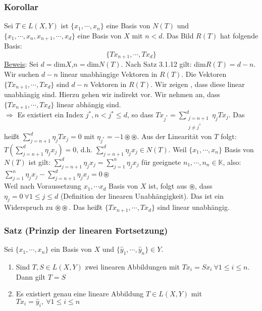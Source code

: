 \subsubsection{Korollar}
Sei $T\in L(X,Y)$ ist $\{x_1,\cdots ,x_n\}$ eine Basis von $N(T)$ und $\{x_1,\cdots ,x_n,x_{n+1},\cdots ,x_d\}$ eine Basis von $X$ mit $n<d$.  Das Bild $R(T)$ hat folgende Basis:
\[\{Tx_{n+1},\cdots ,Tx_d\}\]
\underline{Beweis}:  Sei $d=$dim$X$,$n=$dim$N(T)$.  Nach Satz 3.1.12 gilt:
dim$R(T)=d-n$.  Wir suchen $d-n$ linear unabhängige Vektoren in $R(T)$.  Die Vektoren $\{Tx_{n+1},\cdots ,Tx_d\}$ sind $d-n$ Vektoren in $R(T)$.  Wir zeigen , dass diese linear unabhängig sind. Hierzu gehen wir indirekt vor.  Wir nehmen an, dass $\{Tx_{n+1},\cdots ,Tx_d\}$ linear abhängig sind.\\
$\Rightarrow$ Es existiert ein Index $j^*,n<j^*\leq d$, so dass $Tx_{j^*}=\sum_{\substack{j=n+1\\ j\not= j^*}}^d \eta _jTx_j$.  Das heißt $\sum_{j=n+1}^d \eta _jTx_j=0$ mit $\eta _{j^*}=-1 \circledast\circledast$.  Aus der Linearität von $T$ folgt: $T(\sum_{j=n+1}^d \eta _jx_j)=0$, d.h. $\sum_{j=n+1}^d \eta _jx_j \in N(T)$.  Weil $\{ x_1,\cdots ,x_n\}$ Basis von $N(T)$ ist gilt: $\sum_{j=n+1}^d\eta _jx_j=\sum_{j=1}^n\eta _jx_j$ für geeignete $n_1,\cdots ,n_n\in\mathbb{K}$, also: $\sum_{j=1}^n\eta _jx_j-\sum_{j=n+1}^d\eta _jx_j=0 \circledast$\\
Weil nach Voraussetzung $x_1,\cdots x_d$ Basis von $X$ ist, folgt aus $\circledast$, dass $\eta _j=0\ \forall 1\leq j\leq d$ (Definition der linearen Unabhängigkeit).  Das ist ein Widerspruch zu $\circledast\circledast$.  Das heißt $\{Tx_{n+1},\cdots ,Tx_d\}$ sind linear unabhängig.
\subsubsection{Satz (Prinzip der linearen Fortsetzung)}
Sei $\{x_1,\cdots ,x_n\}$ ein Basis von $X$ und $\{\hat{y}_1,\cdots ,\hat{y}_n\} \in Y$.
\renewcommand{\labelenumi}{(\alph{enumi})}
\begin{enumerate}
\item Sind $T,S\in L(X,Y)$ zwei linearen Abbildungen mit $Tx_i=Sx_i\ \forall 1\leq i\leq n$.  Dann gilt $T=S$
\item Es existiert genau eine lineare Abbildung $T\in L(X,Y)$ mit $Tx_i=\hat{y}_i,\ \forall 1\leq i\leq n$
\end{enumerate}
